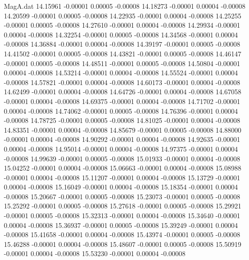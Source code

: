 \begin{filecontents}{MagA.dat}
  14.15961   -0.00001    0.00005   -0.00008
  14.18273   -0.00001    0.00004   -0.00008
  14.20599   -0.00001    0.00005   -0.00008
  14.22935   -0.00001    0.00004   -0.00008
  14.25255   -0.00001    0.00005   -0.00008
  14.27610   -0.00001    0.00004   -0.00008
  14.29934   -0.00001    0.00004   -0.00008
  14.32254   -0.00001    0.00005   -0.00008
  14.34568   -0.00001    0.00004   -0.00008
  14.36884   -0.00001    0.00004   -0.00008
  14.39197   -0.00001    0.00005   -0.00008
  14.41502   -0.00001    0.00005   -0.00008
  14.43821   -0.00001    0.00005   -0.00008
  14.46147   -0.00001    0.00005   -0.00008
  14.48511   -0.00001    0.00005   -0.00008
  14.50804   -0.00001    0.00004   -0.00008
  14.53214   -0.00001    0.00004   -0.00008
  14.55524   -0.00001    0.00004   -0.00008
  14.57821   -0.00001    0.00004   -0.00008
  14.60173   -0.00001    0.00004   -0.00008
  14.62499   -0.00001    0.00004   -0.00008
  14.64726   -0.00001    0.00004   -0.00008
  14.67058   -0.00001    0.00004   -0.00008
  14.69375   -0.00001    0.00004   -0.00008
  14.71702   -0.00001    0.00004   -0.00008
  14.74062   -0.00001    0.00005   -0.00008
  14.76396   -0.00001    0.00004   -0.00008
  14.78725   -0.00001    0.00005   -0.00008
  14.81025   -0.00001    0.00004   -0.00008
  14.83351   -0.00001    0.00004   -0.00008
  14.85679   -0.00001    0.00005   -0.00008
  14.88000   -0.00001    0.00004   -0.00008
  14.90292   -0.00001    0.00004   -0.00008
  14.92635   -0.00001    0.00004   -0.00008
  14.95014   -0.00001    0.00004   -0.00008
  14.97375   -0.00001    0.00004   -0.00008
  14.99639   -0.00001    0.00005   -0.00008
  15.01933   -0.00001    0.00004   -0.00008
  15.04252   -0.00001    0.00004   -0.00008
  15.06663   -0.00001    0.00004   -0.00008
  15.08988   -0.00001    0.00004   -0.00008
  15.11207   -0.00001    0.00004   -0.00008
  15.13729   -0.00001    0.00004   -0.00008
  15.16049   -0.00001    0.00004   -0.00008
  15.18354   -0.00001    0.00004   -0.00008
  15.20667   -0.00001    0.00005   -0.00008
  15.23073   -0.00001    0.00005   -0.00008
  15.25292   -0.00001    0.00005   -0.00008
  15.27618   -0.00001    0.00005   -0.00008
  15.29921   -0.00001    0.00005   -0.00008
  15.32313   -0.00001    0.00004   -0.00008
  15.34640   -0.00001    0.00004   -0.00008
  15.36937   -0.00001    0.00005   -0.00008
  15.39249   -0.00001    0.00004   -0.00008
  15.41658   -0.00001    0.00004   -0.00008
  15.43974   -0.00001    0.00005   -0.00008
  15.46288   -0.00001    0.00004   -0.00008
  15.48607   -0.00001    0.00005   -0.00008
  15.50919   -0.00001    0.00004   -0.00008
  15.53230   -0.00001    0.00004   -0.00008

\end{filecontents}
